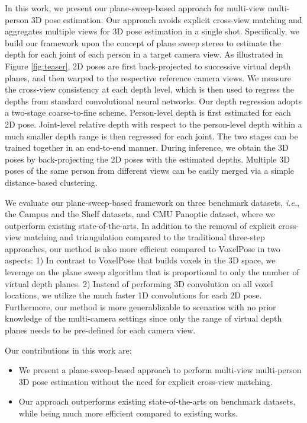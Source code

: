 \documentclass[final]{cvpr}
\begin{document}
In this work, we present our plane-sweep-based approach for multi-view multi-person 3D pose estimation.
Our approach avoids explicit cross-view matching and aggregates multiple views for 3D pose estimation in a single shot.
Specifically, we build our framework upon the concept of plane sweep stereo \cite{collins1996space} to estimate the depth for each joint of each person in a target camera view.
As illustrated in Figure \ref{fig:teaser}, 2D poses are first back-projected to successive virtual depth planes, and then warped to the respective reference camera views.
We measure the cross-view consistency at each depth level,
which is then used to regress the depths from standard convolutional neural networks.
Our depth regression adopts a two-stage coarse-to-fine scheme.
Person-level depth is first estimated for each 2D pose.
Joint-level relative depth with respect to the person-level depth within a much smaller depth range is then regressed for each joint.
The two stages can be trained together in an end-to-end manner.
During inference, we obtain the 3D poses by back-projecting the 2D poses with the estimated depths.
Multiple 3D poses of the same person from different views can be easily merged via a simple distance-based clustering.

We evaluate our plane-sweep-based framework on three benchmark datasets, \textit{i.e.}, the Campus and the Shelf datasets, and CMU Panoptic dataset, where we outperform existing state-of-the-arts.
In addition to the removal of explicit cross-view matching and triangulation compared to the traditional three-step approaches, our method is also more efficient compared to VoxelPose in two aspects: 1) In contrast to VoxelPose that builds voxels in the 3D space, we leverage on the plane sweep algorithm
that is proportional to only the number of virtual depth planes.
2) Instead of performing 3D convolution on all voxel locations, we
utilize the much faster 1D convolutions for each 2D pose.
Furthermore, our method is more generablizable to scenarios with no prior knowledge of the multi-camera settings since only the range of virtual depth planes needs to be pre-defined for each camera view.


Our contributions in this work are:
\begin{itemize}
    \item We present a plane-sweep-based approach to perform multi-view multi-person 3D pose estimation without the need for explicit cross-view matching.
    \item Our approach outperforms existing state-of-the-arts on benchmark datasets, while being much more efficient compared to existing works.
\end{itemize}
\end{document}
